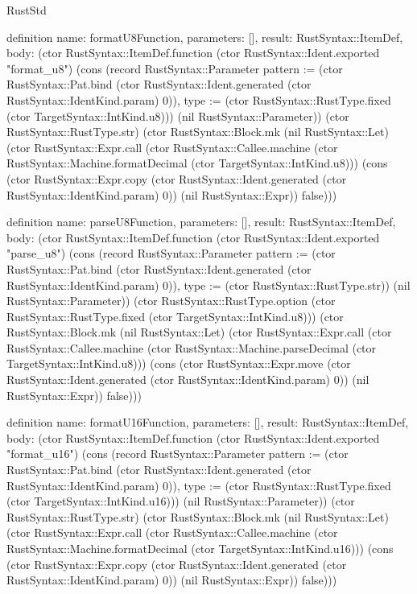 \begin{lexlean}{RustStd}
\begin{semanticmodule}
definition{
  name: formatU8Function,
  parameters: [],
  result: RustSyntax::ItemDef,
  body: (ctor RustSyntax::ItemDef.function (ctor RustSyntax::Ident.exported "format_u8") (cons (record RustSyntax::Parameter {pattern := (ctor RustSyntax::Pat.bind (ctor RustSyntax::Ident.generated (ctor RustSyntax::IdentKind.param) 0)), type := (ctor RustSyntax::RustType.fixed (ctor TargetSyntax::IntKind.u8))}) (nil RustSyntax::Parameter)) (ctor RustSyntax::RustType.str) (ctor RustSyntax::Block.mk (nil RustSyntax::Let) (ctor RustSyntax::Expr.call (ctor RustSyntax::Callee.machine (ctor RustSyntax::Machine.formatDecimal (ctor TargetSyntax::IntKind.u8))) (cons (ctor RustSyntax::Expr.copy (ctor RustSyntax::Ident.generated (ctor RustSyntax::IdentKind.param) 0)) (nil RustSyntax::Expr)) false)))
}

definition{
  name: parseU8Function,
  parameters: [],
  result: RustSyntax::ItemDef,
  body: (ctor RustSyntax::ItemDef.function (ctor RustSyntax::Ident.exported "parse_u8") (cons (record RustSyntax::Parameter {pattern := (ctor RustSyntax::Pat.bind (ctor RustSyntax::Ident.generated (ctor RustSyntax::IdentKind.param) 0)), type := (ctor RustSyntax::RustType.str)}) (nil RustSyntax::Parameter)) (ctor RustSyntax::RustType.option (ctor RustSyntax::RustType.fixed (ctor TargetSyntax::IntKind.u8))) (ctor RustSyntax::Block.mk (nil RustSyntax::Let) (ctor RustSyntax::Expr.call (ctor RustSyntax::Callee.machine (ctor RustSyntax::Machine.parseDecimal (ctor TargetSyntax::IntKind.u8))) (cons (ctor RustSyntax::Expr.move (ctor RustSyntax::Ident.generated (ctor RustSyntax::IdentKind.param) 0)) (nil RustSyntax::Expr)) false)))
}

definition{
  name: formatU16Function,
  parameters: [],
  result: RustSyntax::ItemDef,
  body: (ctor RustSyntax::ItemDef.function (ctor RustSyntax::Ident.exported "format_u16") (cons (record RustSyntax::Parameter {pattern := (ctor RustSyntax::Pat.bind (ctor RustSyntax::Ident.generated (ctor RustSyntax::IdentKind.param) 0)), type := (ctor RustSyntax::RustType.fixed (ctor TargetSyntax::IntKind.u16))}) (nil RustSyntax::Parameter)) (ctor RustSyntax::RustType.str) (ctor RustSyntax::Block.mk (nil RustSyntax::Let) (ctor RustSyntax::Expr.call (ctor RustSyntax::Callee.machine (ctor RustSyntax::Machine.formatDecimal (ctor TargetSyntax::IntKind.u16))) (cons (ctor RustSyntax::Expr.copy (ctor RustSyntax::Ident.generated (ctor RustSyntax::IdentKind.param) 0)) (nil RustSyntax::Expr)) false)))
}


\end{semanticmodule}
\end{lexlean}
